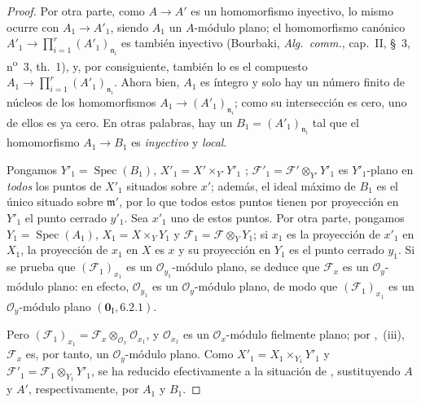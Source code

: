 \begin{proof}
Por otra parte, como $A\to A'$ es un homomorfismo
inyectivo, lo mismo ocurre con $A_1\to A'_1$, siendo $A_1$ un $A$-módulo plano;
el homomorfismo canónico
$A'_1\longrightarrow\prod_{i=1}^{r}(A'_1)_{\mathfrak n_i}$
es también inyectivo (Bourbaki, \emph{Alg.\ comm.}, cap.~II, \S~3, n\textsuperscript{o}~3, th.~1), y, por consiguiente, también lo es el compuesto $A_1\to\prod_{i=1}^{r}(A'_1)_{\mathfrak n_i}$.
Ahora bien, $A_1$ es íntegro y solo hay un número finito de núcleos de los homomorfismos $A_1\to(A'_1)_{\mathfrak n_i}$; como su intersección es cero, uno de ellos es ya cero.
En otras palabras, hay un $B_1=(A'_1)_{\mathfrak n_i}$ tal que el homomorfismo $A_1\to B_1$ es \emph{inyectivo} y \emph{local}.

Pongamos $Y'_1=\operatorname{Spec}(B_1)$, $X'_1=X'\times_{Y'}Y'_1$ ; $\mathcal F'_1=\mathcal F'\otimes_{Y'}Y'_1$ es $Y'_1$-plano en \emph{todos} los puntos de $X'_1$ situados sobre $x'$; además, el ideal máximo de $B_1$ es el único situado sobre $\mathfrak m'$, por lo que todos estos puntos tienen por proyección en $Y'_1$ el punto cerrado $y'_1$.
Sea $x'_1$ uno de estos puntos.
Por otra parte, pongamos $Y_1=\operatorname{Spec}(A_1)$, $X_1=X\times_Y Y_1$ y $\mathcal F_1=\mathcal F\otimes_Y Y_1$; si $x_1$ es la proyección de $x'_1$ en $X_1$, la proyección de $x_1$ en $X$ es $x$ y su proyección en $Y_1$ es el punto cerrado $y_1$.
Si se prueba que $(\mathcal F_1)_{x_1}$ es un $\mathcal O_{y_1}$-módulo plano, se deduce que $\mathcal F_x$ es un $\mathcal O_y$-módulo plano: en efecto, $\mathcal O_{y_1}$ es un $\mathcal O_y$-módulo plano, de modo que $(\mathcal F_1)_{x_1}$ es un $\mathcal O_y$-módulo plano $(\mathbf 0_{\mathrm I},6.2.1)$.

Pero $(\mathcal F_1)_{x_1}=\mathcal F_x\otimes_{\mathcal O_x}\mathcal O_{x_1}$, y $\mathcal O_{x_1}$ es un $\mathcal O_x$-módulo fielmente plano; por ,~(iii), $\mathcal F_x$ es, por tanto, un $\mathcal O_y$-módulo plano.
Como $X'_1=X_1\times_{Y_1}Y'_1$ y $\mathcal F'_1=\mathcal F_1\otimes_{Y_1}Y'_1$, se ha reducido efectivamente a la situación de , sustituyendo $A$ y $A'$, respectivamente, por $A_1$ y $B_1$.


\end{proof}
